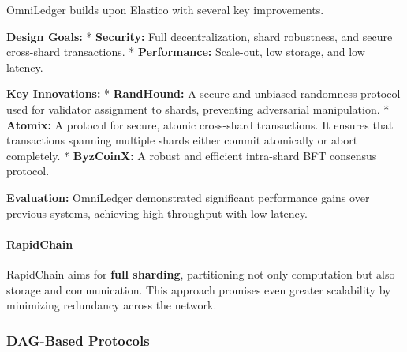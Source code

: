 OmniLedger builds upon Elastico with several key improvements.

\textbf{Design Goals:} * \textbf{Security:} Full decentralization, shard
robustness, and secure cross-shard transactions. * \textbf{Performance:}
Scale-out, low storage, and low latency.

\textbf{Key Innovations:} * \textbf{RandHound:} A secure and unbiased
randomness protocol used for validator assignment to shards, preventing
adversarial manipulation. * \textbf{Atomix:} A protocol for secure,
atomic cross-shard transactions. It ensures that transactions spanning
multiple shards either commit atomically or abort completely. *
\textbf{ByzCoinX:} A robust and efficient intra-shard BFT consensus
protocol.


\textbf{Evaluation:} OmniLedger demonstrated significant performance
gains over previous systems, achieving high throughput with low latency.


\paragraph{RapidChain}\label{rapidchain}

RapidChain aims for \textbf{full sharding}, partitioning not only
computation but also storage and communication. This approach promises
even greater scalability by minimizing redundancy across the network.


\subsubsection{DAG-Based Protocols}\label{dag-based-protocols}


